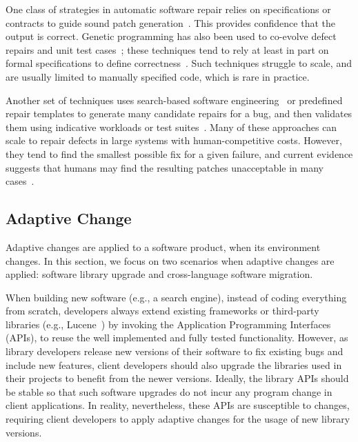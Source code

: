 \documentclass[runningheads,a4paper]{llncs}
\begin{document}
One class of strategies in automatic software repair relies on specifications or contracts to guide sound patch generation~\cite{gopinath2011, liblit2011, liu2012, semfix13,Wei:2010:AutoFix-E}. This provides confidence that the output is correct.  Genetic programming has also been used to co-evolve defect repairs and unit test cases~\cite{Arcuri11,wilkerson2012}; these techniques tend to rely at least in part on formal specifications to define correctness~\cite{arcuriy08,wilkerson11}.  Such techniques struggle to scale, and are usually limited to manually specified code, which is rare in practice.

Another set of techniques uses search-based software engineering~\cite{harman07} or predefined repair templates to generate many candidate repairs for a bug, and then validates them using indicative workloads or test suites~\cite{Kim2013:PAR, genprog-icse2012, Perkins09:clearview}.  Many of these approaches can scale to repair defects in large systems with human-competitive costs.  However, they tend to find the smallest possible fix for a given failure, and current evidence suggests that humans may find the resulting patches unacceptable in many cases~\cite{genprog-maintainability,Kim2013:PAR}. 

\subsection{Adaptive Change}
\label{sec:adaptive}

Adaptive changes are applied to a software product, when its environment changes. In this section, we focus on two scenarios when adaptive changes are applied: software library upgrade and cross-language software migration.


When building new software (e.g., a search engine), instead of coding everything from scratch, developers always extend existing frameworks or third-party libraries (e.g., Lucene~\cite{lucene}) by invoking the Application Programming Interfaces (APIs), to reuse the well implemented and fully tested functionality. However, as library developers release new versions of their software to fix existing bugs and include new features, client developers should also upgrade the libraries used in their projects to benefit from the newer versions. Ideally, the library APIs should be stable so that such software upgrades do not incur any program change in client applications. In reality, nevertheless, these APIs are susceptible to changes, requiring client developers to apply adaptive changes for the usage of new library versions. 
\end{document}
